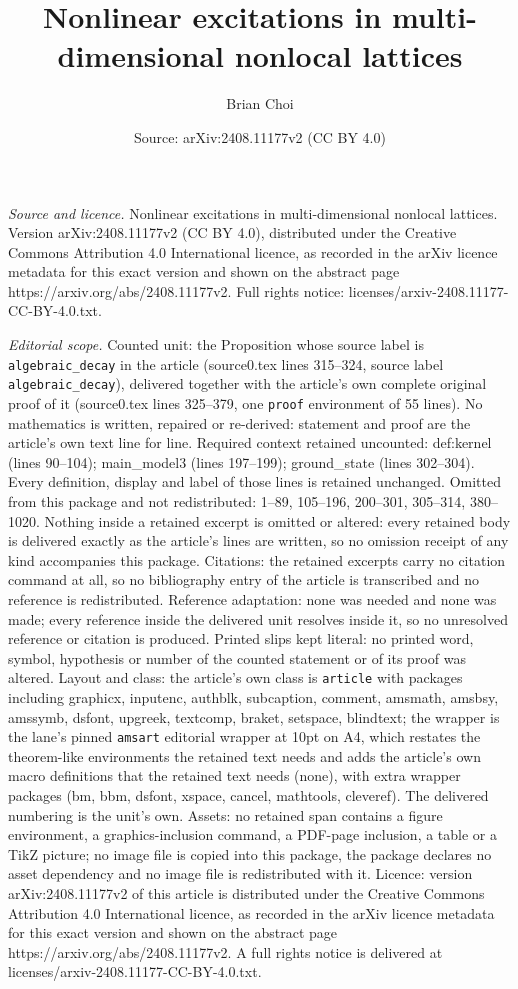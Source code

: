 \documentclass[10pt,a4paper]{amsart}
\title[Nonlinear excitations in multi-dimensional nonlocal lattices]{Nonlinear excitations in multi-dimensional nonlocal lattices}
\author{Brian Choi}
\date{Source: arXiv:2408.11177v2 (CC BY 4.0)}
\begin{document}
\maketitle

\noindent\emph{Source and licence.} Nonlinear excitations in multi-dimensional nonlocal lattices. Version arXiv:2408.11177v2 (CC BY 4.0), distributed under the Creative Commons Attribution 4.0 International licence, as recorded in the arXiv licence metadata for this exact version and shown on the abstract page https://arxiv.org/abs/2408.11177v2. Full rights notice: licenses/arxiv-2408.11177-CC-BY-4.0.txt.\par\smallskip

\noindent\textit{Editorial scope.} Counted unit: the Proposition whose source label is \texttt{algebraic\_decay} in the article (source0.tex lines 315--324, source label \texttt{algebraic\_decay}), delivered together with the article's own complete original proof of it (source0.tex lines 325--379, one \texttt{proof} environment of 55 lines). No mathematics is written, repaired or re-derived: statement and proof are the article's own text line for line. Required context retained uncounted: def:kernel (lines 90--104); main\_model3 (lines 197--199); ground\_state (lines 302--304). Every definition, display and label of those lines is retained unchanged. Omitted from this package and not redistributed: 1--89, 105--196, 200--301, 305--314, 380--1020. Nothing inside a retained excerpt is omitted or altered: every retained body is delivered exactly as the article's lines are written, so no omission receipt of any kind accompanies this package. Citations: the retained excerpts carry no citation command at all, so no bibliography entry of the article is transcribed and no reference is redistributed. Reference adaptation: none was needed and none was made; every reference inside the delivered unit resolves inside it, so no unresolved reference or citation is produced. Printed slips kept literal: no printed word, symbol, hypothesis or number of the counted statement or of its proof was altered. Layout and class: the article's own class is \texttt{article} with packages including graphicx, inputenc, authblk, subcaption, comment, amsmath, amsbsy, amssymb, dsfont, upgreek, textcomp, braket, setspace, blindtext; the wrapper is the lane's pinned \texttt{amsart} editorial wrapper at 10pt on A4, which restates the theorem-like environments the retained text needs and adds the article's own macro definitions that the retained text needs (none), with extra wrapper packages (bm, bbm, dsfont, xspace, cancel, mathtools, cleveref). The delivered numbering is the unit's own. Assets: no retained span contains a figure environment, a graphics-inclusion command, a PDF-page inclusion, a table or a TikZ picture; no image file is copied into this package, the package declares no asset dependency and no image file is redistributed with it. Licence: version arXiv:2408.11177v2 of this article is distributed under the Creative Commons Attribution 4.0 International licence, as recorded in the arXiv licence metadata for this exact version and shown on the abstract page https://arxiv.org/abs/2408.11177v2. A full rights notice is delivered at licenses/arxiv-2408.11177-CC-BY-4.0.txt. 
\end{document}

